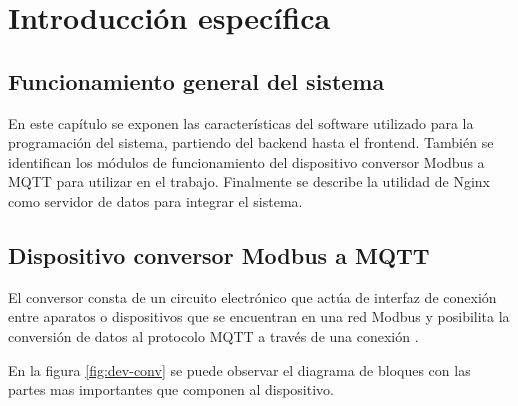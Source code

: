 \chapter{Introducción específica} %

\label{Chapter2}

\section{Funcionamiento general del sistema}

En este capítulo se exponen las características del software utilizado para la programación del sistema, partiendo del backend hasta el frontend. También se identifican los módulos de funcionamiento del dispositivo conversor Modbus a MQTT para utilizar en el trabajo.  Finalmente se describe la utilidad de Nginx como servidor de datos para integrar el sistema. 



\section{Dispositivo conversor Modbus a MQTT}

El conversor consta de un circuito electrónico que actúa de interfaz de conexión entre aparatos o dispositivos que se encuentran en una red Modbus y posibilita la conversión de datos al protocolo MQTT a través de una conexión .

En la figura \ref{fig:dev-conv} se puede observar el diagrama de bloques con las partes mas importantes que componen al dispositivo. 

